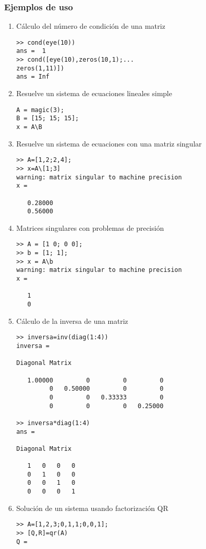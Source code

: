 \documentclass[letter,11pt]{article}
\begin{document}
\subsubsection{Ejemplos de uso}
\begin{multicols}{2}
\begin{enumerate}
\item C\'alculo del n\'umero de condici\'on de una matriz
\begin{verbatim}
>> cond(eye(10))
ans =  1
>> cond([eye(10),zeros(10,1);...
zeros(1,11)])
ans = Inf
\end{verbatim}
\item Resuelve un sistema de ecuaciones lineales simple
\begin{verbatim}
A = magic(3);
B = [15; 15; 15];
x = A\B
\end{verbatim}
%
\item Resuelve un sistema de ecuaciones con una matriz singular
\begin{verbatim}
>> A=[1,2;2,4];
>> x=A\[1;3]
warning: matrix singular to machine precision
x =

   0.28000
   0.56000
\end{verbatim}
%
\item Matrices singulares con problemas de precisi\'on
\begin{verbatim}
>> A = [1 0; 0 0];
>> b = [1; 1];
>> x = A\b
warning: matrix singular to machine precision
x =

   1
   0
\end{verbatim}

\item C\'alculo de la inversa de una matriz 
\begin{verbatim}
>> inversa=inv(diag(1:4))
inversa =

Diagonal Matrix

   1.00000         0         0         0
         0   0.50000         0         0
         0         0   0.33333         0
         0         0         0   0.25000

>> inversa*diag(1:4)
ans =

Diagonal Matrix

   1   0   0   0
   0   1   0   0
   0   0   1   0
   0   0   0   1

\end{verbatim}
\item Soluci\'on de un sistema usando factorizaci\'on QR
\begin{verbatim}
>> A=[1,2,3;0,1,1;0,0,1];
>> [Q,R]=qr(A)
Q =


\end{verbatim}
\end{enumerate}
\end{multicols}
\end{document}

